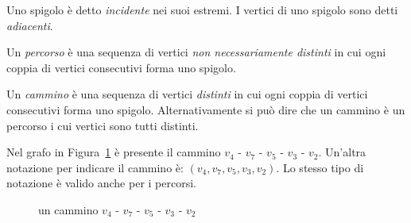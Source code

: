\begin{defn}
Uno spigolo è detto \emph{incidente} nei suoi estremi. I vertici di uno spigolo sono detti \emph{adiacenti}.
\end{defn}

\begin{defn}[percorso]
	Un \emph{percorso} è una sequenza di vertici \emph{non necessariamente distinti} in cui ogni coppia di vertici consecutivi forma uno spigolo.
\end{defn}

\begin{defn}[cammino]
Un \emph{cammino} è una sequenza di vertici \emph{distinti} in cui ogni coppia di vertici consecutivi
forma uno spigolo. Alternativamente si può dire che un cammino è un percorso i cui vertici sono tutti distinti.
\end{defn}

\begin{ese}
Nel grafo in Figura~\ref{fig:camm_semplice} è presente il cammino 
${v_4 \text{ - } v_7 \text{ - } v_5 \text{ - } v_3 \text{ - } v_2 }$. Un'altra notazione
per indicare il cammino è: ${(v_4, v_7, v_5, v_3, v_2)}$. Lo stesso tipo di notazione è valido
anche per i percorsi.
    \begin{figure}[H]
        \centering
        \caption{un cammino $v_4 \text{ - } v_7 \text{ - } v_5 \text{ - } v_3 \text{ - } v_2 $}
        \label{fig:camm_semplice}
    \end{figure}
	\QEDA
\end{ese}

